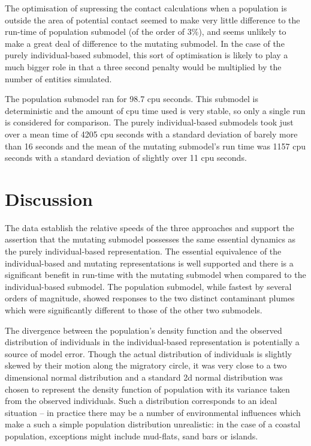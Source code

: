 \documentclass{article}
\begin{document}
The optimisation of supressing the contact calculations when a population is
outside the area of potential contact seemed to make very little difference to
the run-time of population submodel (of the order of 3\%), and seems unlikely
to make a great deal of difference to the mutating submodel. In the case of
the purely individual-based submodel, this sort of optimisation is likely to
play a much bigger role in that a three second penalty would be multiplied by
the number of entities simulated.

The population submodel ran for 98.7 cpu seconds. This submodel is
deterministic and the amount of cpu time used is very stable, so only a single
run is considered for comparison. The purely individual-based submodels took
just over a mean time of 4205 cpu seconds with a standard deviation of barely
more than 16 seconds and the mean of the mutating submodel's run time was 1157
cpu seconds with a standard deviation of slightly over 11 cpu seconds.



\section{Discussion}

The data establish the relative speeds of the three approaches and support the
assertion that the mutating submodel possesses the same essential dynamics as
the purely individual-based representation. The essential equivalence of the
individual-based and mutating representations is well supported and there is a
significant benefit in run-time with the mutating submodel when compared to
the individual-based submodel. The population submodel, while fastest by
several orders of magnitude, showed responses to the two distinct contaminant
plumes which were significantly different to those of the other two submodels.

The divergence between the population's density function and the observed
distribution of individuals in the individual-based representation is
potentially a source of model error. Though the actual distribution of
individuals is slightly skewed by their motion along the migratory circle, it
was very close to a two dimensional normal distribution and a standard 2d
normal distribution was chosen to represent the density function of population
with its variance taken from the observed individuals. Such a distribution
corresponds to an ideal situation -- in practice there may be a number of
environmental influences which make a such a simple population distribution
unrealistic: in the case of a coastal population, exceptions might include
mud-flats, sand bars or islands.
\end{document}
